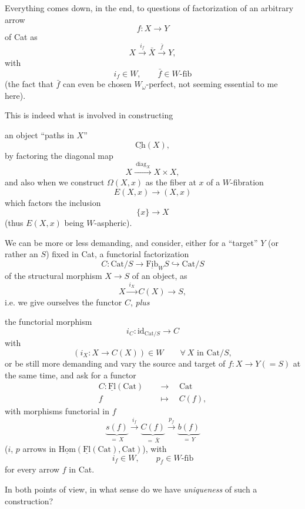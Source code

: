 \documentclass[11pt]{article}
\newcommand{\printedpage}[1]{\marginpar{\footnotesize p.~#1}}
\newcommand{\msp}[1]{\marginpar{\footnotesize [#1]}}
\newcommand{\Ch}{\underline{\mathrm{Ch}}}
\newcommand{\Fib}{\underline{\mathrm{Fib}}}
\newcommand{\Fl}{\underline{\mathrm{Fl}}}
\newcommand{\Hom}{\underline{\mathrm{Hom}}}
\newcommand{\Cat}{\mathrm{Cat}}
\begin{document}
Everything comes down, in the end, to questions of factorization of an arbitrary arrow
\[
f : X \longrightarrow Y
\]
\printedpage{127}
of Cat as
\[
X \xrightarrow{\ i_f\ } \bar{X} \xrightarrow{\ \bar{f}\ } Y,
\]
with
\[
i_f \in W, \qquad \bar{f} \in W\text{-fib}
\]
(the fact that $\bar{f}$ can even be chosen $W_\omega$-perfect, not seeming essential to me here).

This is indeed what is involved in constructing

\msp{page 192}
an object ``paths in $X$''
\[
\Ch(X),
\]
by factoring the diagonal map
\[
X \xrightarrow{\ \mathrm{diag}_X\ } X \times X,
\]
and also when we construct $\Omega(X,x)$ as the fiber at $x$ of a $W$-fibration
\[
E(X,x) \longrightarrow (X,x)
\]
which factors the inclusion
\[
\{x\} \longrightarrow X
\]
(thus $E(X,x)$ being $W$-aspheric).

We can be more or less demanding, and consider, either for a ``target'' $Y$ (or rather an $S$) fixed in Cat, a functorial factorization
\[
C : \Cat/S \longrightarrow \Fib_W S \hookrightarrow \Cat/S
\]
of the structural morphism $X \longrightarrow S$ of an object, as
\[
X \xrightarrow{\ i_X\ } C(X) \longrightarrow S,
\]
i.e. we give ourselves the functor $C$, \textit{plus}

\msp{page 193}
the functorial morphism
\[
i_C : \mathrm{id}_{\Cat/S} \longrightarrow C
\]
with
\[
(i_X : X \longrightarrow C(X)) \in W \qquad \forall\ X \text{ in } \Cat/S,
\]
or be still more demanding and vary the source and target of $f : X \longrightarrow Y (= S)$ at the same time, and ask for a functor
\[
\begin{aligned}
C : \Fl(\Cat) \quad &\longrightarrow \quad \Cat \\
f \quad &\longmapsto \quad C(f),
\end{aligned}
\]
\printedpage{128}
with morphisms functorial in $f$
\[
\underbrace{s(f)}_{=\,X} \xrightarrow{\ i_f\ } \underbrace{C(f)}_{=\,\bar{X}} \xrightarrow{\ p_f\ } \underbrace{b(f)}_{=\,Y}
\]
($i$, $p$ arrows in $\Hom(\Fl(\Cat),\Cat)$), with
\[
i_f \in W, \qquad p_f \in W\text{-fib}
\]
for every arrow $f$ in Cat.

\msp{page 194}
In both points of view, in what sense do we have \textit{uniqueness} of such a construction?
\end{document}
